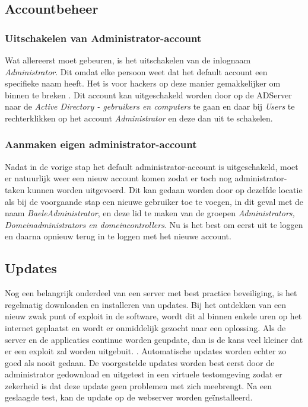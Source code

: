 \documentclass[pdftex,a4paper,12pt]{report}
\begin{document}
\subsection{Accountbeheer}
\subsubsection{Uitschakelen van Administrator-account}
Wat allereerst moet gebeuren, is het uitschakelen van de inlognaam \textit{Administrator}. Dit omdat elke persoon weet dat het default account een specifieke naam heeft. Het is voor hackers op deze manier gemakkelijker om binnen te breken . Dit account kan uitgeschakeld worden door op de ADServer naar de \textit{Active Directory - gebruikers en computers} te gaan en daar bij \textit{Users} te rechterklikken op het account \textit{Administrator} en deze dan uit te schakelen.

\subsubsection{Aanmaken eigen administrator-account}
Nadat in de vorige stap het default administrator-account is uitgeschakeld, moet er natuurlijk weer een nieuw account komen zodat er toch nog administrator-taken kunnen worden uitgevoerd. Dit kan gedaan worden door op dezelfde locatie als bij de voorgaande stap een nieuwe gebruiker toe te voegen, in dit geval met de naam \textit{BaeleAdministrator}, en deze lid te maken van de groepen \textit{Administrators, Domeinadministrators en domeincontrollers}. Nu is het best om eerst uit te loggen en daarna opnieuw terug in te loggen met het nieuwe account.

\subsection{Updates}
Nog een belangrijk onderdeel van een server met best practice beveiliging, is het regelmatig downloaden en installeren van updates. Bij het ontdekken van een nieuw zwak punt of exploit in de software, wordt dit al binnen enkele uren op het internet geplaatst en wordt er onmiddelijk gezocht naar een oplossing. Als de server en de applicaties continue worden geupdate, dan is de kans veel kleiner dat er een exploit zal worden uitgebuit. \citep{Cott2012}. Automatische updates worden echter zo goed als nooit gedaan. De voorgestelde updates worden best eerst door de administrator gedownload en uitgetest in een virtuele testomgeving zodat er zekerheid is dat deze update geen problemen met zich meebrengt. Na een geslaagde test, kan de update op de webserver worden geïnstalleerd.
\end{document}
